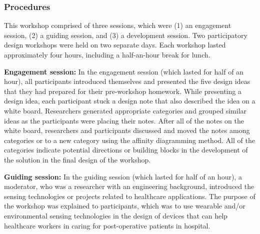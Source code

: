 \subsubsection{Procedures}
This workshop comprised of three sessions, which were (1) an engagement session, (2) a guiding session, and (3) a development session. Two participatory design workshops were held on two separate days. Each workshop lasted approximately four hours, including a half-an-hour break for lunch.

\textbf{Engagement session:} 
\newline
In the engagement session (which lasted for half of an hour), all participants introduced themselves and presented the five design ideas that they had prepared for their pre-workshop homework. While presenting a design idea, each participant stuck a design note that also described the idea on a white board. Researchers generated appropriate categories and grouped similar ideas as the participants were placing their notes. After all of the notes on the white board, researchers and participants discussed and moved the notes among categories or to a new category using the affinity diagramming method. All of the categories indicate potential directions or building blocks in the development of the solution in the final design of the workshop. 

\textbf{Guiding session:} 
\newline
In the guiding session (which lasted for half of an hour), a moderator, who was a researcher with an engineering background, introduced the sensing technologies or projects related to healthcare applications. The purpose of the workshop was explained to participants, which was to use wearable and/or environmental sensing technologies in the design of devices that can help healthcare workers in caring for post-operative patients in hospital. 


